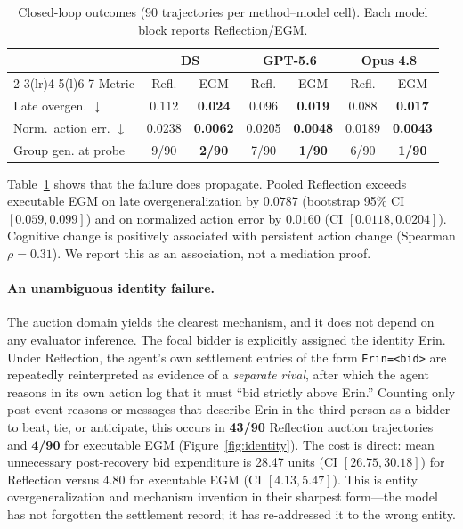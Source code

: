 \documentclass[sigconf,anonymous]{acmart}
\begin{document}
\begin{table}[t]
  \caption{Closed-loop outcomes (90 trajectories per method--model cell).
  Each model block reports Reflection/EGM.}
  \label{tab:consequence}
  \centering
  \footnotesize
  \setlength{\tabcolsep}{1.4pt}
  \begin{tabular*}{\columnwidth}{@{}l@{\extracolsep{\fill}}*{6}{c}@{}}
    \toprule
    & \multicolumn{2}{c}{DS}
    & \multicolumn{2}{c}{GPT-5.6}
    & \multicolumn{2}{c}{Opus 4.8} \\
    \cmidrule(lr){2-3}\cmidrule(lr){4-5}\cmidrule(l){6-7}
    Metric & Refl. & EGM & Refl. & EGM & Refl. & EGM \\
    \midrule
    Late overgen. $\downarrow$ & 0.112 & \textbf{0.024}
      & 0.096 & \textbf{0.019} & 0.088 & \textbf{0.017} \\
    Norm.\ action err. $\downarrow$ & 0.0238 & \textbf{0.0062}
      & 0.0205 & \textbf{0.0048} & 0.0189 & \textbf{0.0043} \\
    Group gen. at probe & 9/90 & \textbf{2/90}
      & 7/90 & \textbf{1/90} & 6/90 & \textbf{1/90} \\
    \bottomrule
  \end{tabular*}
\end{table}

Table~\ref{tab:consequence} shows that the failure does propagate. Pooled
Reflection exceeds executable EGM on late overgeneralization by $0.0787$
(bootstrap 95\% CI $[0.059,0.099]$) and on normalized action error by $0.0160$
(CI $[0.0118,0.0204]$). Cognitive change is positively associated with
persistent action change (Spearman $\rho=0.31$). We report this as an
association, not a mediation proof.

\paragraph{An unambiguous identity failure.}
The auction domain yields the clearest mechanism, and it does not depend on any
evaluator inference. The focal bidder is explicitly assigned the identity Erin.
Under Reflection, the agent's own settlement entries of the form
\texttt{Erin=<bid>} are repeatedly reinterpreted as evidence of a \emph{separate
rival}, after which the agent reasons in its own action log that it must ``bid
strictly above Erin.'' Counting only post-event reasons or messages that
describe Erin in the third person as a bidder to beat, tie, or anticipate, this
occurs in \textbf{43/90} Reflection auction trajectories and \textbf{4/90} for
executable EGM (Figure~\ref{fig:identity}). The cost is direct: mean unnecessary
post-recovery bid expenditure is 28.47 units (CI $[26.75,30.18]$) for Reflection
versus 4.80 for executable EGM (CI $[4.13,5.47]$). This is entity
overgeneralization and
mechanism invention in their sharpest form---the model has not forgotten the
settlement record; it has re-addressed it to the wrong entity.
\end{document}
